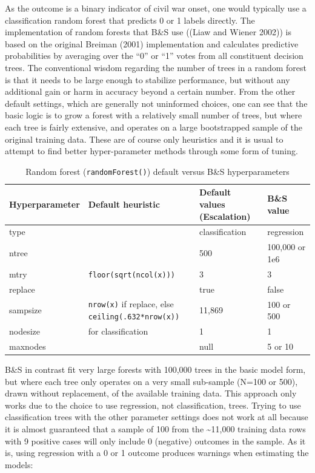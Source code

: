 \documentclass[
]{article}
\begin{document}
As the outcome is a binary indicator of civil war onset, one would typically use a classification random forest that predicts 0 or 1 labels directly. The implementation of random forests that B\&S use ((Liaw and Wiener 2002)) is based on the original Breiman (2001) implementation and calculates predictive probabilities by averaging over the ``0'' or ``1'' votes from all constituent decision trees. The conventional wisdom regarding the number of trees in a random forest is that it needs to be large enough to stabilize performance, but without any additional gain or harm in accuracy beyond a certain number. From the other default settings, which are generally not uninformed choices, one can see that the basic logic is to grow a forest with a relatively small number of trees, but where each tree is fairly extensive, and operates on a large bootstrapped sample of the original training data. These are of course only heuristics and it is usual to attempt to find better hyper-parameter methods through some form of tuning.

\begin{table}
\caption{\label{tab:hp} Random forest (\texttt{randomForest()}) default versus B\&S hyperparameters}
\begin{tabular}{l>{\raggedright\arraybackslash}p{2in}ll}
\toprule
Hyperparameter & Default heuristic & Default values (Escalation) & B\&S value \\
\midrule
type & & classification & regression \\
ntree & & 500 & 100,000 or 1e6 \\
mtry & \texttt{floor(sqrt(ncol(x)))} & 3 & 3 \\
replace & & true & false \\
sampsize & \texttt{nrow(x)} if replace, else \texttt{ceiling(.632*nrow(x))} & 11,869 & 100 or
500 \\
nodesize & 1 for classification & 1 & 1 \\
maxnodes & & null & 5 or 10 \\
\bottomrule
\end{tabular}
\end{table}

B\&S in contrast fit very large forests with 100,000 trees in the basic model form, but where each tree only operates on a very small sub-sample (N=100 or 500), drawn without replacement, of the available training data. This approach only works due to the choice to use regression, not classification, trees. Trying to use classification trees with the other parameter settings does not work at all because it is almost guaranteed that a sample of 100 from the \textasciitilde11,000 training data rows with 9 positive cases will only include 0 (negative) outcomes in the sample. As it is, using regression with a 0 or 1 outcome produces warnings when estimating the models:
\end{document}
